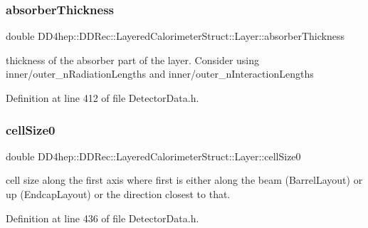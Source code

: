 \subsubsection{\texorpdfstring{absorber\+Thickness}{absorberThickness}}
{\footnotesize\ttfamily double D\+D4hep\+::\+D\+D\+Rec\+::\+Layered\+Calorimeter\+Struct\+::\+Layer\+::absorber\+Thickness}



thickness of the absorber part of the layer. Consider using inner/outer\+\_\+n\+Radiation\+Lengths and inner/outer\+\_\+n\+Interaction\+Lengths 



Definition at line 412 of file Detector\+Data.\+h.

\hypertarget{struct_d_d4hep_1_1_d_d_rec_1_1_layered_calorimeter_struct_1_1_layer_a648ec7174a8858e289b87214835d2fbf}{}\label{struct_d_d4hep_1_1_d_d_rec_1_1_layered_calorimeter_struct_1_1_layer_a648ec7174a8858e289b87214835d2fbf} 
\subsubsection{\texorpdfstring{cell\+Size0}{cellSize0}}
{\footnotesize\ttfamily double D\+D4hep\+::\+D\+D\+Rec\+::\+Layered\+Calorimeter\+Struct\+::\+Layer\+::cell\+Size0}



cell size along the first axis where first is either along the beam (Barrel\+Layout) or up (Endcap\+Layout) or the direction closest to that. 



Definition at line 436 of file Detector\+Data.\+h.

\hypertarget{struct_d_d4hep_1_1_d_d_rec_1_1_layered_calorimeter_struct_1_1_layer_afbf7fe6d692de53e93a654dbdd8a866a}{}\label{struct_d_d4hep_1_1_d_d_rec_1_1_layered_calorimeter_struct_1_1_layer_afbf7fe6d692de53e93a654dbdd8a866a} 
